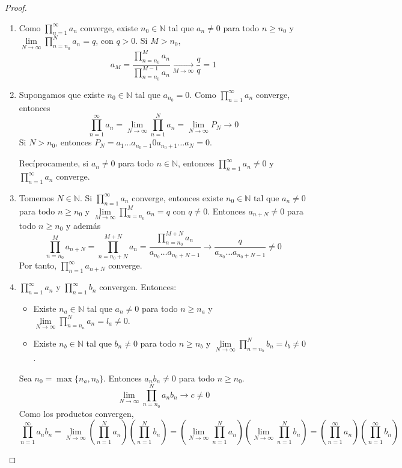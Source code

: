 \begin{proof}
    \hfill
    \begin{enumerate}
        \item Como $\prod_{n=1}^\infty a_n$ converge, existe $n_0 \in \mathbb{N}$ tal que $a_n \neq 0$ para todo $n \geq n_0$ y $\lim\limits_{N \to \infty} \prod_{n=n_0}^N a_n = q$, con $q > 0$.
              Si $M > n_0$,
              $$a_M = \frac{\prod_{n=n_0}^M a_n}{\prod_{n=n_0}^{M-1} a_n} \xrightarrow[M \to \infty]{} \frac{q}{q} = 1$$

        \item Supongamos que existe $n_0 \in \mathbb{N}$ tal que $a_{n_0} = 0$.
              Como $\prod_{n=1}^\infty a_n$ converge, entonces
              $$\prod_{n=1}^\infty a_n = \lim_{N \to \infty} \prod_{n=1}^N a_n = \lim_{N \to \infty} P_N \to 0$$
              Si $N > n_0$, entonces $P_N = a_1\dots a_{n_0-1}0a_{n_0+1}\dots a_N = 0$.

              Recíprocamente, si $a_n \neq 0$ para todo $n \in \mathbb{N}$, entonces $\prod_{n=1}^\infty a_n \neq 0$ y $\prod_{n=1}^\infty a_n$ converge.

        \item Tomemos $N \in \mathbb{N}$.
              Si $\prod_{n=1}^\infty a_n$ converge, entonces existe $n_0 \in \mathbb{N}$ tal que $a_n \neq 0$ para todo $n \geq n_0$ y $\lim\limits_{M \to \infty} \prod_{n=n_0}^M a_n = q$ con $q \neq 0$.
              Entonces $a_{n+N} \neq 0$ para todo $n \geq n_0$ y además
              $$\prod_{n=n_0}^M a_{n+N} = \prod_{n=n_0+N}^{M+N} a_n = \frac{\prod_{n=n_0}^{M+N} a_n}{a_{n_0}\dots a_{n_0+N-1}} \to \frac{q}{a_{n_0}\dots a_{n_0+N-1}} \neq 0$$
              Por tanto, $\prod_{n=1}^\infty a_{n+N}$ converge.

        \item $\prod_{n=1}^\infty a_n$ y $\prod_{n=1}^\infty b_n$ convergen.
              Entonces:
              \begin{itemize}
                  \item Existe $n_a \in \mathbb{N}$ tal que $a_n \neq 0$ para todo $n \geq n_a$ y $\lim\limits_{N \to \infty} \prod_{n=n_a}^N a_n = l_a \neq 0$.
                  \item Existe $n_b \in \mathbb{N}$ tal que $b_n \neq 0$ para todo $n \geq n_b$ y $\lim\limits_{N \to \infty} \prod_{n=n_b}^N b_n = l_b \neq 0$.
              \end{itemize}
              Sea $n_0 = \max\{n_a, n_b\}$.
              Entonces $a_nb_n \neq 0$ para todo $n \geq n_0$.
              $$\lim_{N \to \infty} \prod_{n=n_0}^N a_nb_n \to c \neq 0$$
              Como los productos convergen,
              $$\prod_{n=1}^\infty a_nb_n = \lim_{N \to \infty} \left(\prod_{n=1}^N a_n\right) \left(\prod_{n=1}^N b_n\right) = \left(\lim_{N \to \infty} \prod_{n=1}^N a_n\right) \left(\lim_{N \to \infty} \prod_{n=1}^N b_n\right) = \left(\prod_{n=1}^\infty a_n\right) \left(\prod_{n=1}^\infty b_n\right)$$
    \end{enumerate}
\end{proof}

